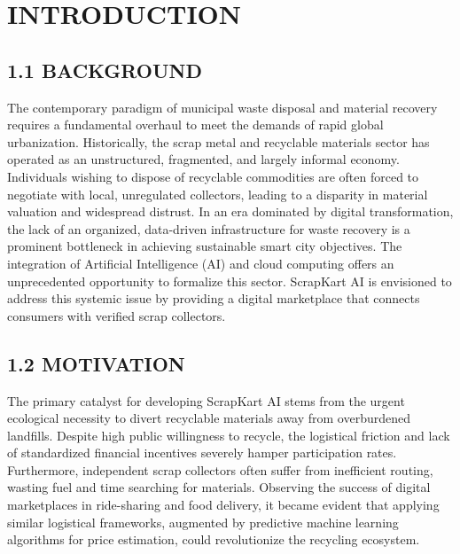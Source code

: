\chapter{INTRODUCTION}

\section{1.1 BACKGROUND}
The contemporary paradigm of municipal waste disposal and material recovery requires a fundamental overhaul to meet the demands of rapid global urbanization. Historically, the scrap metal and recyclable materials sector has operated as an unstructured, fragmented, and largely informal economy. Individuals wishing to dispose of recyclable commodities are often forced to negotiate with local, unregulated collectors, leading to a disparity in material valuation and widespread distrust. In an era dominated by digital transformation, the lack of an organized, data-driven infrastructure for waste recovery is a prominent bottleneck in achieving sustainable smart city objectives. The integration of Artificial Intelligence (AI) and cloud computing offers an unprecedented opportunity to formalize this sector. ScrapKart AI is envisioned to address this systemic issue by providing a digital marketplace that connects consumers with verified scrap collectors.

\section{1.2 MOTIVATION}
The primary catalyst for developing ScrapKart AI stems from the urgent ecological necessity to divert recyclable materials away from overburdened landfills. Despite high public willingness to recycle, the logistical friction and lack of standardized financial incentives severely hamper participation rates. Furthermore, independent scrap collectors often suffer from inefficient routing, wasting fuel and time searching for materials. Observing the success of digital marketplaces in ride-sharing and food delivery, it became evident that applying similar logistical frameworks, augmented by predictive machine learning algorithms for price estimation, could revolutionize the recycling ecosystem. 

